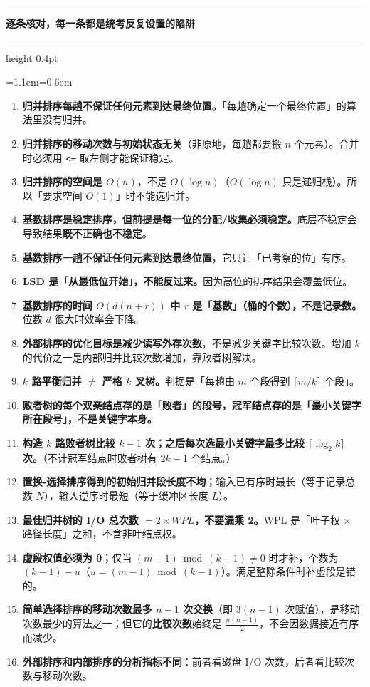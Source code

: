 \documentclass[11pt,openany,UTF8]{ctexbook}
\newcommand{\callouthead}[2]{%
  \par\addvspace{7pt}\noindent
  {\color{#1}\rule[-0.15em]{3pt}{1.05em}}\hspace{0.5em}%
  {\bfseries\color{#1}#2}\par\nobreak\vspace{-0.35em}%
  {\color{rulesep}\hrule height 0.4pt}\nobreak\vspace{0.45em}%
  \begingroup\small\setlength{\parindent}{0pt}%
  \leftskip=1.1em\rightskip=0.6em\noindent\ignorespaces}
\newcommand{\calloutend}{\par\endgroup\addvspace{7pt}}
\newenvironment{callwarn}[1]{\callouthead{warnbar}{#1}}{\calloutend}
\begin{document}
\begin{callwarn}{逐条核对，每一条都是统考反复设置的陷阱}
\begin{enumerate}
\item \textbf{归并排序每趟不保证任何元素到达最终位置。}「每趟确定一个最终位置」的算法里没有归并。
\item \textbf{归并排序的移动次数与初始状态无关}（非原地，每趟都要搬 $n$ 个元素）。合并时必须用 \texttt{<\allowbreak{}=\allowbreak{}} 取左侧才能保证稳定。
\item \textbf{归并排序的空间是 $O(n)$}，不是 $O(\log n)$（$O(\log n)$ 只是递归栈）。所以「要求空间 $O(1)$」时不能选归并。
\item \textbf{基数排序是稳定排序，但前提是每一位的分配/收集必须稳定。}底层不稳定会导致结果\textbf{既不正确也不稳定}。
\item \textbf{基数排序一趟不保证任何元素到达最终位置}，它只让「已考察的位」有序。
\item \textbf{LSD 是「从最低位开始」，不能反过来。}因为高位的排序结果会覆盖低位。
\item \textbf{基数排序的时间 $O(d(n+r))$ 中 $r$ 是「基数」（桶的个数），不是记录数。}位数 $d$ 很大时效率会下降。
\item \textbf{外部排序的优化目标是减少读写外存次数}，不是减少关键字比较次数。增加 $k$ 的代价之一是内部归并比较次数增加，靠败者树解决。
\item \textbf{$k$ 路平衡归并 $\neq$ 严格 $k$ 叉树。}判据是「每趟由 $m$ 个段得到 $\lceil m/k\rceil$ 个段」。
\item \textbf{败者树的每个双亲结点存的是「败者」的段号，冠军结点存的是「最小关键字所在段号」，不是关键字本身。}
\item \textbf{构造 $k$ 路败者树比较 $k-1$ 次；之后每次选最小关键字最多比较 $\lceil\log_2 k\rceil$ 次。}（不计冠军结点时败者树有 $2k-1$ 个结点。）
\item \textbf{置换-选择排序得到的初始归并段长度不均}；输入已有序时最长（等于记录总数 $N$），输入逆序时最短（等于缓冲区长度 $L$）。
\item \textbf{最佳归并树的 I/O 总次数 $=2\times WPL$，不要漏乘 2。}WPL 是「叶子权 $\times$ 路径长度」之和，不含非叶结点权。
\item \textbf{虚段权值必须为 0}；仅当 $(m-1)\bmod(k-1)\ne0$ 时才补，个数为 $(k-1)-u$（$u=(m-1)\bmod(k-1)$）。满足整除条件时补虚段是错的。
\item \textbf{简单选择排序的移动次数最多 $n-1$ 次交换}（即 $3(n-1)$ 次赋值），是移动次数最少的算法之一；但它的\textbf{比较次数}始终是 $\frac{n(n-1)}{2}$，不会因数据接近有序而减少。
\item \textbf{外部排序和内部排序的分析指标不同}：前者看磁盘 I/O 次数，后者看比较次数与移动次数。
\end{enumerate}
\end{callwarn}
\end{document}

